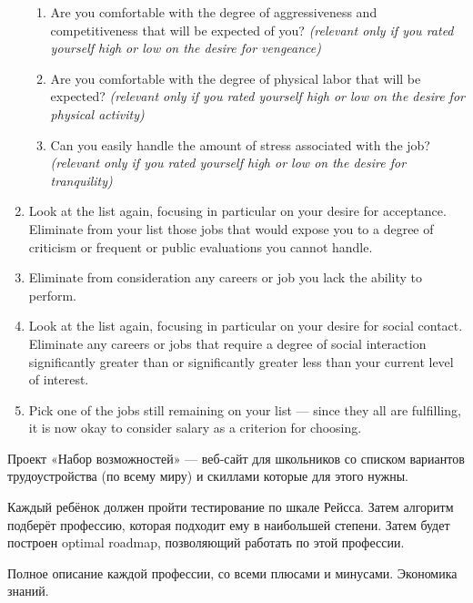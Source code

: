 \documentclass[11pt]{article}
\theoremstyle{remark}
\theoremstyle{definition}
\begin{document}
\begin{enumerate}
\begin{enumerate}
\item Are you comfortable with the degree of aggressiveness and competitiveness that will be expected of you? \textit{(relevant only if you rated yourself high or low on the desire for vengeance)}
\item Are you comfortable with the degree of physical labor that will be expected? \textit{(relevant only if you rated yourself high or low on the desire for physical activity)}
\item Can you easily handle the amount of stress associated with the job? \textit{(relevant only if you rated yourself high or low on the desire for tranquility)}

\end{enumerate}

\item Look at the list again, focusing in particular on your desire for acceptance. Eliminate from your list those jobs that would expose you to a degree of criticism or frequent or public evaluations you cannot handle.

\item Eliminate from consideration any careers or job you lack the ability to perform. 

\item Look at the list again, focusing in particular on your desire for social contact. Eliminate any careers or jobs that require a degree of social interaction significantly greater than or significantly greater less than your current level of interest.

\item Pick one of the jobs still remaining on your list --- since they all are fulfilling, it is now okay to consider salary as a criterion for choosing.


\end{enumerate}





Проект «Набор возможностей» --- веб-сайт для школьников со списком вариантов трудоустройства (по всему миру) и скиллами которые для этого нужны.

Каждый ребёнок должен пройти тестирование по шкале Рейсса. Затем алгоритм подберёт профессию, которая подходит ему в наибольшей степени. Затем будет построен optimal roadmap, позволяющий работать по этой профессии.




Полное описание каждой профессии, со всеми плюсами и минусами. Экономика знаний.
\end{document}
